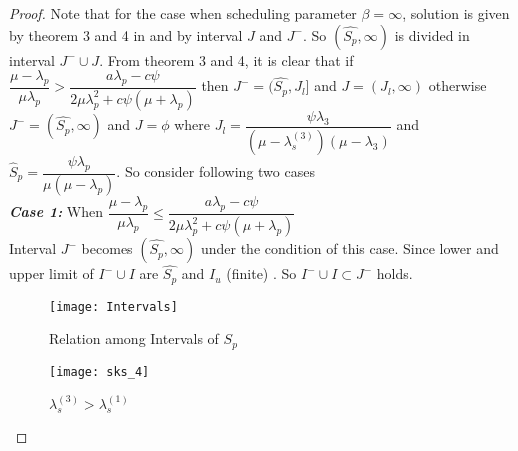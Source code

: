 \documentclass[12pt, a4paper]{report}
\begin{document}
\begin{proof} Note that for the case when scheduling parameter $\beta = \infty$, solution is given by theorem 3 and 4 in \cite{Sudhir_standard_style} and by interval $J$ and $J^-$. So $(\hat{S_p},\infty)$ is divided in interval $J^-\cup J$. From theorem 3 and 4, it is clear that if $\dfrac{\mu -\lambda_p}{\mu \lambda_p} >\dfrac{a\lambda_p-c\psi}{2\mu \lambda_p^2+c\psi(\mu +\lambda_p)}$ then $J^- = (\hat{S_p},J_l]$ and $J = (J_l,\infty)$ otherwise $J^- = (\hat{S_p},\infty)$ and $J=\phi$ where $J_l = \dfrac{\psi \lambda_3}{(\mu-\lambda_s^{(3)})(\mu-\lambda_3)}$ and $\hat{S}_p = \dfrac{\psi\lambda_p}{\mu(\mu-\lambda_p)}$. So consider following two cases\\
\indent \textit{\textbf{Case 1:}} When $\dfrac{\mu -\lambda_p}{\mu \lambda_p} \leq \dfrac{a\lambda_p-c\psi}{2\mu \lambda_p^2+c\psi(\mu +\lambda_p)}$\\
Interval $J^-$ becomes $(\hat{S_p},\infty)$ under the condition of this case. Since lower and upper limit of $I^-\cup I$ are $\hat{S_p}$ and $I_u$ (finite) \cite{Sudhir_standard_style}. So $I^- \cup I \subset J^-$ holds.\\
\vspace{-0.3in}

\begin{figure}[ht]
\begin{minipage}[b]{0.5\linewidth}
\texttt{[image: Intervals]}
\caption{Relation among Intervals of $S_p$ \cite{bharat_thesis}}
\end{minipage}
\hspace{0.5cm}
\begin{minipage}[b]{0.5\linewidth}
\centering
\texttt{[image: sks\_4]}
 \caption{ $\lambda_s^{(3)} > \lambda_s^{(1)}$ \cite{Sudhir_standard_style} }
\end{minipage}
\end{figure}


\end{proof}
\end{document}
